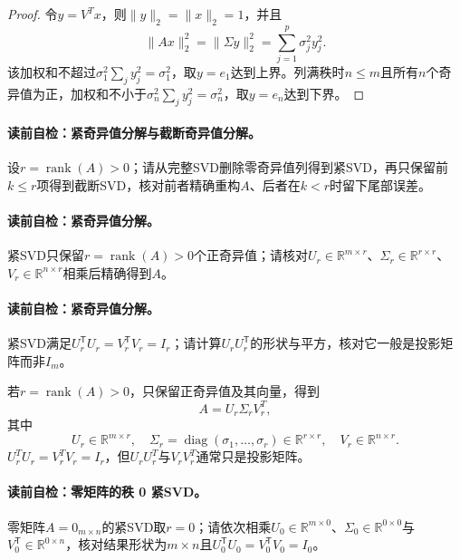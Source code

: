\begin{proof}
令$y=V^Tx$，则$\|y\|_2=\|x\|_2=1$，并且
\[
\|Ax\|_2^2=\|\Sigma y\|_2^2
=\sum_{j=1}^{p}\sigma_j^2y_j^2.
\]
该加权和不超过$\sigma_1^2\sum_jy_j^2=\sigma_1^2$，取$y=e_1$达到上界。列满秩时$n\leq m$且所有$n$个奇异值为正，加权和不小于$\sigma_n^2\sum_jy_j^2=\sigma_n^2$，取$y=e_n$达到下界。
\end{proof}

\paragraph{读前自检：紧奇异值分解与截断奇异值分解。}设$r=\operatorname{rank}(A)>0$；请从完整SVD删除零奇异值列得到紧SVD，再只保留前$k\le r$项得到截断SVD，核对前者精确重构$A$、后者在$k<r$时留下尾部误差。\par
\paragraph{读前自检：紧奇异值分解。}紧SVD只保留$r=\operatorname{rank}(A)>0$个正奇异值；请核对$U_r\in\mathbb R^{m\times r}$、$\Sigma_r\in\mathbb R^{r\times r}$、$V_r\in\mathbb R^{n\times r}$相乘后精确得到$A$。\par

\paragraph{读前自检：紧奇异值分解。}紧SVD满足$U_r^{\mathsf T}U_r=V_r^{\mathsf T}V_r=I_r$；请计算$U_rU_r^{\mathsf T}$的形状与平方，核对它一般是投影矩阵而非$I_m$。\par

\begin{definition}[紧奇异值分解]\label{def:V4-C03-compact-svd}
若$r=\operatorname{rank}(A)>0$，只保留正奇异值及其向量，得到
\[
A=U_r\Sigma_rV_r^T,
\]
其中
\[
U_r\in\mathbb R^{m\times r},\quad
\Sigma_r=\operatorname{diag}(\sigma_1,\ldots,\sigma_r)\in\mathbb R^{r\times r},\quad
V_r\in\mathbb R^{n\times r}.
\]
$U_r^TU_r=V_r^TV_r=I_r$，但$U_rU_r^T$与$V_rV_r^T$通常只是投影矩阵。
\end{definition}

\paragraph{读前自检：零矩阵的秩 0 紧SVD。}零矩阵$A=0_{m\times n}$的紧SVD取$r=0$；请依次相乘$U_0\in\mathbb R^{m\times0}$、$\Sigma_0\in\mathbb R^{0\times0}$与$V_0^{\mathsf T}\in\mathbb R^{0\times n}$，核对结果形状为$m\times n$且$U_0^{\mathsf T}U_0=V_0^{\mathsf T}V_0=I_0$。\par


